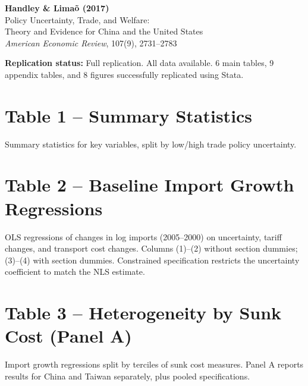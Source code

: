 \documentclass[12pt]{article}
\begin{document}
\begin{center}
{\Large\bfseries Handley \& Lima\~{o} (2017)}\\
{\large Policy Uncertainty, Trade, and Welfare:}\\
{\large Theory and Evidence for China and the United States}\\
\vspace{0.5em}
{\normalsize \textit{American Economic Review}, 107(9), 2731--2783}
\end{center}

\vspace{1em}
\noindent\textbf{Replication status:} Full replication. All data available.
6 main tables, 9 appendix tables, and 8 figures successfully replicated using Stata.

\tableofcontents

\clearpage
\section{Table 1 -- Summary Statistics}

Summary statistics for key variables, split by low/high trade policy uncertainty.



\clearpage
\section{Table 2 -- Baseline Import Growth Regressions}

OLS regressions of changes in log imports (2005--2000) on uncertainty, tariff changes,
and transport cost changes. Columns (1)--(2) without section dummies; (3)--(4) with section dummies.
Constrained specification restricts the uncertainty coefficient to match the NLS estimate.



\clearpage
\section{Table 3 -- Heterogeneity by Sunk Cost (Panel A)}

Import growth regressions split by terciles of sunk cost measures.
Panel A reports results for China and Taiwan separately, plus pooled specifications.
\end{document}
